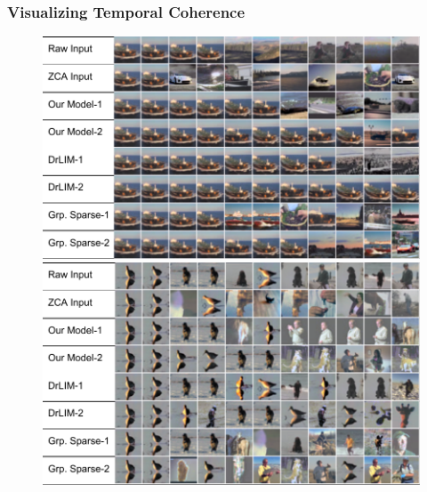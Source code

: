 \documentclass{beamer}
\begin{document}
\begin{frame}
\frametitle{Visualizing Temporal Coherence}
\begin{center} 
\begin{figure}
\includegraphics[scale=0.40]{./Figures/Project1/NNtime1.pdf}\\ \vspace{0.25cm} 
\includegraphics[scale=0.40]{./Figures/Project1/NNtime2.pdf}
\end{figure}
\end{center}  
\end{frame} 
\end{document}
